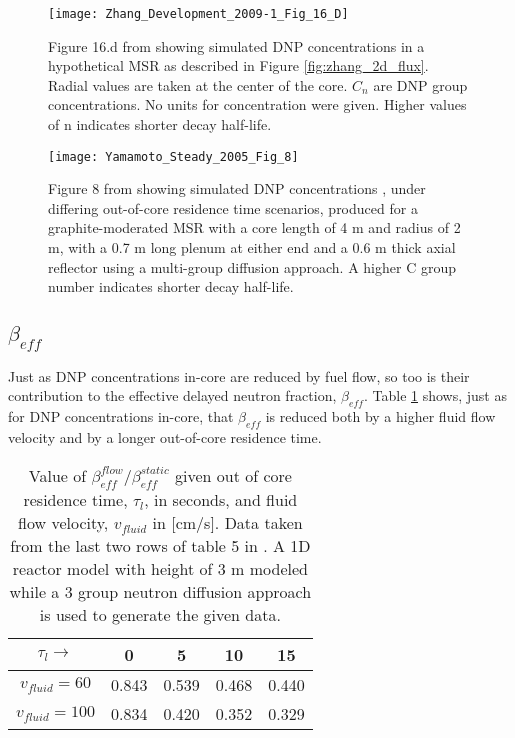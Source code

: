 \documentclass[review]{elsarticle}
\begin{document}
\begin{figure}[H]
   \centering
   \texttt{[image: Zhang\_Development\_2009-1\_Fig\_16\_D]}
   \caption{Figure 16.d from \cite{zhang_development_2009-1} showing simulated DNP concentrations
               in a hypothetical MSR as described in Figure \ref{fig:zhang_2d_flux}.
               Radial
               values are taken at the center of the core. $C_{n}$ are DNP
               group concentrations. No units for concentration were given.
               Higher values of n indicates shorter decay half-life.}
   \label{fig:zhang_radial_velocity_dnp_2}
\end{figure}

\begin{figure}[H]
   \centering
   \texttt{[image: Yamamoto\_Steady\_2005\_Fig\_8]}
   \caption{Figure 8 from \cite{yamamoto_steady_2005} showing simulated DNP
     concentrations
    , under differing out-of-core residence time scenarios, produced for
    a graphite-moderated MSR with a core length of 4 m and radius of 2 m,
    with a 0.7 m long 
    plenum at either end and a 0.6 m thick axial reflector using a
    multi-group diffusion approach. A higher C group number indicates
    shorter decay half-life.}
   \label{fig:yamamoto_transit_time}
\end{figure}

\subsection{$\beta_{eff}$} \label{ssec:beta}
Just as DNP concentrations in-core are reduced by fuel flow, so too is their
contribution to the effective delayed neutron fraction, $\beta_{eff}$.
Table \ref{tbl:mattioda_beta_reduction} shows, just as for DNP concentrations
in-core, that $\beta_{eff}$ is reduced both by a higher fluid flow velocity and
by a longer out-of-core residence time.

\begin{table}[h]
    \caption{Value of $\beta_{eff}^{flow}/\beta_{eff}^{static}$ given out of
        core residence time, $\tau_{l}$, in seconds, 
        and fluid flow velocity, $v_{fluid}$ in [cm/s]. Data taken from
        the last two rows of table 5
        in \cite{mattioda_effective_2000}. A 1D reactor model with height of 3 m
        modeled while a 3 group neutron diffusion approach is used to generate
        the given data.} 
    \label{tbl:mattioda_beta_reduction}
    \begin{center}
        \begin{tabular}{|c|c|c|c|c|}
            \hline
            $\tau_{l}\rightarrow$ & 0 & 5 & 10 & 15 \\
            \hline
            $v_{fluid} = 60$ & 0.843 & 0.539 & 0.468 & 0.440 \\
            \hline
            $v_{fluid} = 100$ & 0.834 & 0.420 & 0.352 & 0.329 \\
            \hline
        \end{tabular}
    \end{center}
\end{table}
\end{document}
